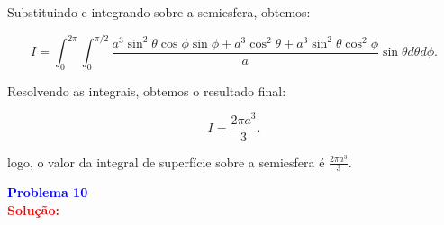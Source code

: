 \documentclass[a4paper,12pt]{article}
\newcommand{\printingbibliography}{%

    \pagestyle{myheadings}
    \markright{}
    \sloppy
    \printbibliography[heading=bibintoc, %
                   title=Refer\^encias %
                  ]
    \fussy%
}
\begin{document}
\begin{flushleft}
Substituindo e integrando sobre a semiesfera, obtemos:

\begin{equation}
I = \int_0^{2\pi} \int_0^{\pi/2} \frac{a^3 \sin^2 \theta \cos \phi \sin \phi + a^3 \cos^2 \theta + a^3 \sin^2 \theta \cos^2 \phi}{a} \sin \theta d\theta d\phi.
\end{equation}

Resolvendo as integrais, obtemos o resultado final:

\begin{equation}
I = \frac{2\pi a^3}{3}.
\end{equation}

logo, o valor da integral de superfície sobre a semiesfera é $\frac{2\pi a^3}{3}$.
\end{flushleft}

\begin{flushleft}
\textbf{\textcolor{blue}{Problema 10}}\\


\textcolor{red}{\textbf{Solução:}}\\
\end{flushleft}

\end{document}
